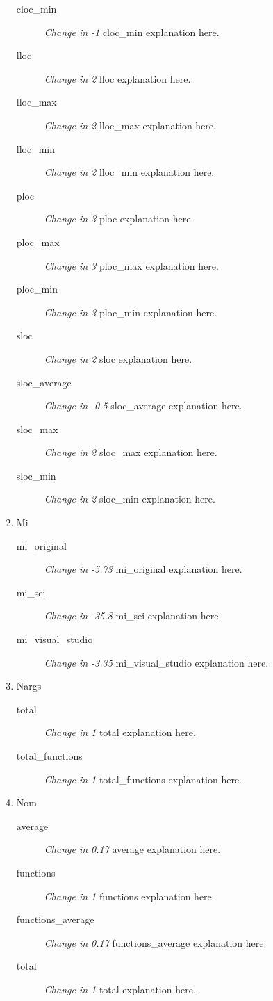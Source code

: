 \begin{enumerate}
\begin{description}
                  \item [cloc\_min] \textit{Change in -1} cloc\_min explanation here.
                  \item [lloc] \textit{Change in 2} lloc explanation here.
                  \item [lloc\_max] \textit{Change in 2} lloc\_max explanation here.
                  \item [lloc\_min] \textit{Change in 2} lloc\_min explanation here.
                  \item [ploc] \textit{Change in 3} ploc explanation here.
                  \item [ploc\_max] \textit{Change in 3} ploc\_max explanation here.
                  \item [ploc\_min] \textit{Change in 3} ploc\_min explanation here.
                  \item [sloc] \textit{Change in 2} sloc explanation here.
                  \item [sloc\_average] \textit{Change in -0.5} sloc\_average explanation here.
                  \item [sloc\_max] \textit{Change in 2} sloc\_max explanation here.
                  \item [sloc\_min] \textit{Change in 2} sloc\_min explanation here.
            \end{description}
      \item Mi
            \begin{description}
                  \item [mi\_original] \textit{Change in -5.73} mi\_original explanation here.
                  \item [mi\_sei] \textit{Change in -35.8} mi\_sei explanation here.
                  \item [mi\_visual\_studio] \textit{Change in -3.35} mi\_visual\_studio explanation here.
            \end{description}
      \item Nargs
            \begin{description}
                  \item [total] \textit{Change in 1} total explanation here.
                  \item [total\_functions] \textit{Change in 1} total\_functions explanation here.
            \end{description}
      \item Nom
            \begin{description}
                  \item [average] \textit{Change in 0.17} average explanation here.
                  \item [functions] \textit{Change in 1} functions explanation here.
                  \item [functions\_average] \textit{Change in 0.17} functions\_average explanation here.
                  \item [total] \textit{Change in 1} total explanation here.
            \end{description}
\end{enumerate}
